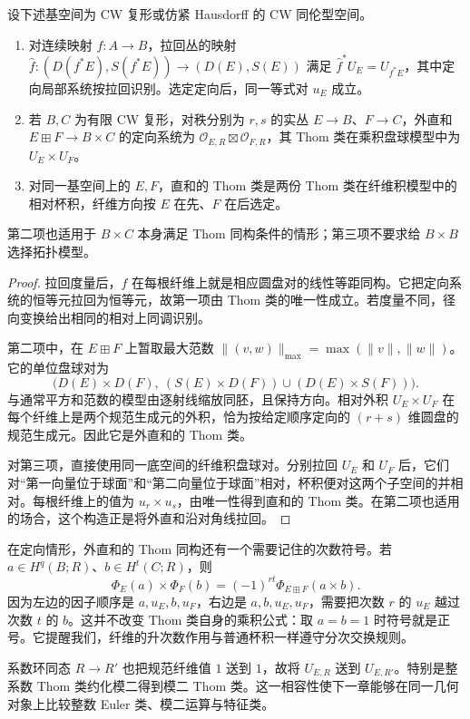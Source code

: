 \begin{proposition}\label{g2:prop:thom-naturality-sum}
	设下述基空间为 CW 复形或仿紧 Hausdorff 的 CW 同伦型空间。
	\begin{enumerate}
		\item 对连续映射 \(f:A\to B\)，拉回丛的映射 \(\widehat f:(D(f^*E),S(f^*E))\to(D(E),S(E))\) 满足 \(\widehat f^*U_E=U_{f^*E}\)，其中定向局部系统按拉回识别。选定定向后，同一等式对 \(u_E\) 成立。
		\item 若 \(B,C\) 为有限 CW 复形，对秩分别为 \(r,s\) 的实丛 \(E\to B\)、\(F\to C\)，外直和 \(E\boxplus F\to B\times C\) 的定向系统为 \(\mathcal O_{E,R}\boxtimes\mathcal O_{F,R}\)，其 Thom 类在乘积盘球模型中为 \(U_E\times U_F\)。
		\item 对同一基空间上的 \(E,F\)，直和的 Thom 类是两份 Thom 类在纤维积模型中的相对杯积，纤维方向按 \(E\) 在先、\(F\) 在后选定。
	\end{enumerate}
	第二项也适用于 \(B\times C\) 本身满足 Thom 同构条件的情形；第三项不要求给 \(B\times B\) 选择拓扑模型。
\end{proposition}
\begin{proof}
	拉回度量后，\(\widehat f\) 在每根纤维上就是相应圆盘对的线性等距同构。它把定向系统的恒等元拉回为恒等元，故第一项由 Thom 类的唯一性成立。若度量不同，径向变换给出相同的相对上同调识别。

	第二项中，在 \(E\boxplus F\) 上暂取最大范数 \(\|(v,w)\|_{\max}=\max(\|v\|,\|w\|)\)。它的单位盘球对为
	\[
		\bigl(D(E)\times D(F),\ (S(E)\times D(F))\cup(D(E)\times S(F))\bigr).
	\]
	与通常平方和范数的模型由逐射线缩放同胚，且保持方向。相对外积 \(U_E\times U_F\) 在每个纤维上是两个规范生成元的外积，恰为按给定顺序定向的 \((r+s)\) 维圆盘的规范生成元。因此它是外直和的 Thom 类。

	对第三项，直接使用同一底空间的纤维积盘球对。分别拉回 \(U_E\) 和 \(U_F\) 后，它们对“第一向量位于球面”和“第二向量位于球面”相对，杯积便对这两个子空间的并相对。每根纤维上的值为 \(u_r\times u_s\)，由唯一性得到直和的 Thom 类。在第二项也适用的场合，这个构造正是将外直和沿对角线拉回。
\end{proof}

\ProseParagraphBreak

在定向情形，外直和的 Thom 同构还有一个需要记住的次数符号。若 \(a\in H^q(B;R)\)、\(b\in H^t(C;R)\)，则
\begin{equation}\label{g2:eq:thom-external-sign}
	\Phi_E(a)\times\Phi_F(b)=(-1)^{rt}\Phi_{E\boxplus F}(a\times b).
\end{equation}
因为左边的因子顺序是 \(a,u_E,b,u_F\)，右边是 \(a,b,u_E,u_F\)，需要把次数 \(r\) 的 \(u_E\) 越过次数 \(t\) 的 \(b\)。这并不改变 Thom 类自身的乘积公式：取 \(a=b=1\) 时符号就是正号。它提醒我们，纤维的升次数作用与普通杯积一样遵守分次交换规则。

系数环同态 \(R\to R'\) 也把规范纤维值 \(1\) 送到 \(1\)，故将 \(U_{E,R}\) 送到 \(U_{E,R'}\)。特别是整系数 Thom 类约化模二得到模二 Thom 类。这一相容性使下一章能够在同一几何对象上比较整数 Euler 类、模二运算与特征类。
